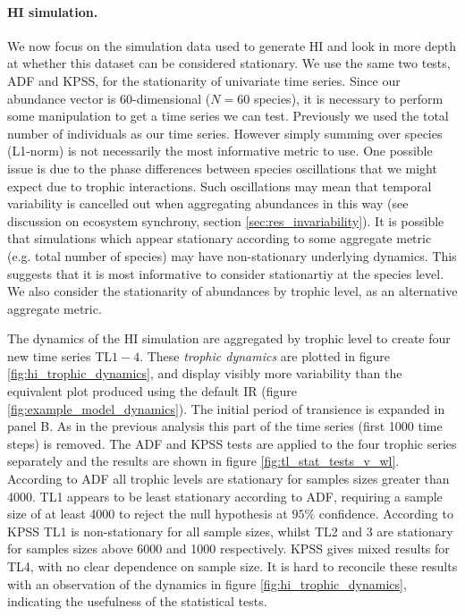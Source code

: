 \paragraph*{HI simulation.}

We now focus on the simulation data used to generate HI and look in more depth at whether this dataset can be considered stationary. We use the same two tests, ADF and KPSS, for the stationarity of univariate time series. Since our abundance vector is 60-dimensional ($N=60$ species), it is necessary to perform some manipulation to get a time series we can test. Previously we used the total number of individuals as our time series. However simply summing over species (L1-norm) is not necessarily the most informative metric to use. One possible issue is due to the phase differences between species oscillations that we might expect due to trophic interactions. Such oscillations may mean that temporal variability is cancelled out when aggregating abundances in this way (see discussion on ecosystem synchrony, section \ref{sec:res_invariability}). It is possible that simulations which appear stationary according to some aggregate metric (e.g. total number of species) may have non-stationary underlying dynamics. This suggests that it is most informative to consider stationartiy at the species level. We also consider the stationarity of abundances by trophic level, as an alternative aggregate metric.

The dynamics of the HI simulation are aggregated by trophic level to create four new time series TL$1-4$. These \emph{trophic dynamics} are plotted in figure \ref{fig:hi_trophic_dynamics}, and display visibly more variability than the equivalent plot produced using the default IR (figure \ref{fig:example_model_dynamics}). The initial period of transience is expanded in panel B. As in the previous analysis this part of the time series (first 1000 time steps) is removed. The ADF and KPSS tests are applied to the four trophic series separately and the results are shown in figure \ref{fig:tl_stat_tests_v_wl}. According to ADF all trophic levels are stationary for samples sizes greater than 4000. TL1 appears to be least stationary according to ADF, requiring a sample size of at least 4000 to reject the null hypothesis at $95\%$ confidence. According to KPSS TL1 is non-stationary for all sample sizes, whilst TL2 and 3 are stationary for samples sizes above 6000 and 1000 respectively. KPSS gives mixed results for TL4, with no clear dependence on sample size. It is hard to reconcile these results with an observation of the dynamics in figure \ref{fig:hi_trophic_dynamics}, indicating the usefulness of the statistical tests. 


